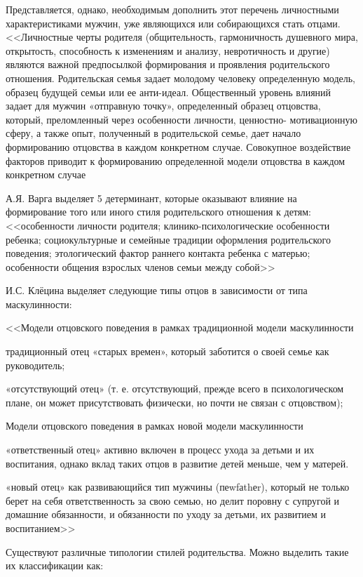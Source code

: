 \documentclass{../../common/thesisbyxetex}
\begin{document}
Представляется, однако, необходимым дополнить этот перечень личностными характеристиками мужчин, 
уже являющихся или собирающихся стать отцами. <<Личностные черты родителя
(общительность, гармоничность душевного мира, открытость, способность к
изменениям и анализу, невротичность и другие) являются важной предпосылкой
формирования и проявления родительского отношения. Родительская семья задает
молодому человеку определенную модель, образец будущей семьи или ее анти-идеал.
Общественный уровень влияний задает для мужчин «отправную точку», определенный
образец отцовства, который, преломленный через особенности личности, ценностно-
мотивационную сферу, а также опыт, полученный в родительской семье, дает начало
формированию отцовства в каждом конкретном случае. Совокупное воздействие
факторов приводит к формированию определенной модели отцовства в каждом
конкретном случае \cite[122]{har}


А.Я. Варга выделяет 5 детерминант, которые оказывают влияние на формирование того или иного стиля
родительского отношения к детям: <<особенности личности родителя; клинико-психологические
особенности ребенка; социокультурные и семейные традиции оформления родительского поведения;
этологический фактор раннего контакта ребенка с матерью; особенности общения взрослых членов семьи
между собой>> \cite[16]{varga}

И.С. Клёцина выделяет следующие типы отцов в зависимости от типа маскулинности:

<<Модели отцовского поведения в рамках традиционной модели маскулинности

традиционный отец «старых времен», который заботится о своей семье как руководитель;

«отсутствующий отец» (т. е. отсутствующий, прежде всего в психологическом плане, он может
присутствовать физически, но почти не связан с отцовством);

Модели отцовского поведения в рамках новой модели маскулинности

«ответственный отец» активно включен в процесс ухода за детьми и их воспитания, однако вклад таких
отцов в развитие детей меньше, чем у матерей.

«новый отец» как развивающийся тип мужчины (пеwfаthеr), который не только берет на себя
ответственность за свою семью, но делит поровну с супругой и домашние обязанности, и обязанности по
уходу за детьми, их развитием и воспитанием>> \cite{clec}



Существуют различные типологии стилей родительства. Можно выделить такие их классификации как:
\end{document}
